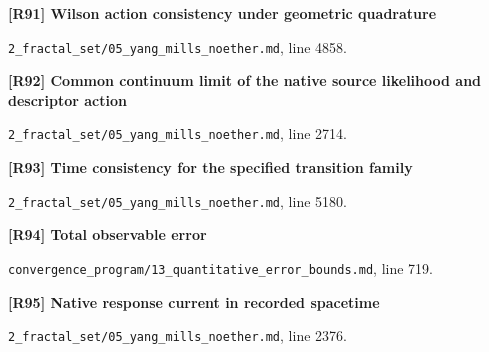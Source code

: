 \documentclass[11pt,a4paper]{article}
\begin{document}
\par\medskip\noindent\begin{minipage}{\linewidth}\textbf{[R91] Wilson action consistency under geometric quadrature}\label{src:thm-continuum-limit-ym}\par
{\small\texttt{}\par
\nolinkurl{2_fractal_set/05_yang_mills_noether.md}, line 4858.\par}
\end{minipage}\par

\par\medskip\noindent\begin{minipage}{\linewidth}\textbf{[R92] Common continuum limit of the native source likelihood and descriptor action}\label{src:thm-ym-continuum-source-action}\par
{\small\texttt{}\par
\nolinkurl{2_fractal_set/05_yang_mills_noether.md}, line 2714.\par}
\end{minipage}\par

\par\medskip\noindent\begin{minipage}{\linewidth}\textbf{[R93] Time consistency for the specified transition family}\label{src:thm-correct-continuum-limit}\par
{\small\texttt{}\par
\nolinkurl{2_fractal_set/05_yang_mills_noether.md}, line 5180.\par}
\end{minipage}\par

\par\medskip\noindent\begin{minipage}{\linewidth}\textbf{[R94] Total observable error}\label{src:thm-total-error-bound}\par
{\small\texttt{}\par
\nolinkurl{convergence_program/13_quantitative_error_bounds.md}, line 719.\par}
\end{minipage}\par

\par\medskip\noindent\begin{minipage}{\linewidth}\textbf{[R95] Native response current in recorded spacetime}\label{src:thm-ym-native-response-current}\par
{\small\texttt{}\par
\nolinkurl{2_fractal_set/05_yang_mills_noether.md}, line 2376.\par}
\end{minipage}\par
\end{document}
